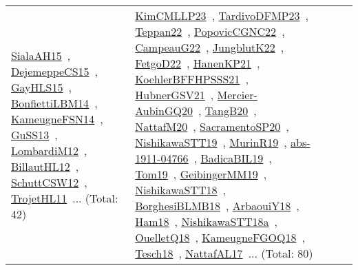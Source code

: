{\begin{longtable}{lp{3cm}>{\raggedright\arraybackslash}p{6cm}>{\raggedright\arraybackslash}p{6cm}>{\raggedright\arraybackslash}p{8cm}}
\href{works/SialaAH15.pdf}{SialaAH15}~\cite{SialaAH15}, \href{works/DejemeppeCS15.pdf}{DejemeppeCS15}~\cite{DejemeppeCS15}, \href{works/GayHLS15.pdf}{GayHLS15}~\cite{GayHLS15}, \href{works/BonfiettiLBM14.pdf}{BonfiettiLBM14}~\cite{BonfiettiLBM14}, \href{works/KameugneFSN14.pdf}{KameugneFSN14}~\cite{KameugneFSN14}, \href{works/GuSS13.pdf}{GuSS13}~\cite{GuSS13}, \href{works/LombardiM12.pdf}{LombardiM12}~\cite{LombardiM12}, \href{works/BillautHL12.pdf}{BillautHL12}~\cite{BillautHL12}, \href{works/SchuttCSW12.pdf}{SchuttCSW12}~\cite{SchuttCSW12}, \href{works/TrojetHL11.pdf}{TrojetHL11}~\cite{TrojetHL11}... (Total: 42) & \href{works/KimCMLLP23.pdf}{KimCMLLP23}~\cite{KimCMLLP23}, \href{works/TardivoDFMP23.pdf}{TardivoDFMP23}~\cite{TardivoDFMP23}, \href{works/Teppan22.pdf}{Teppan22}~\cite{Teppan22}, \href{works/PopovicCGNC22.pdf}{PopovicCGNC22}~\cite{PopovicCGNC22}, \href{works/CampeauG22.pdf}{CampeauG22}~\cite{CampeauG22}, \href{works/JungblutK22.pdf}{JungblutK22}~\cite{JungblutK22}, \href{works/FetgoD22.pdf}{FetgoD22}~\cite{FetgoD22}, \href{works/HanenKP21.pdf}{HanenKP21}~\cite{HanenKP21}, \href{works/KoehlerBFFHPSSS21.pdf}{KoehlerBFFHPSSS21}~\cite{KoehlerBFFHPSSS21}, \href{works/HubnerGSV21.pdf}{HubnerGSV21}~\cite{HubnerGSV21}, \href{works/Mercier-AubinGQ20.pdf}{Mercier-AubinGQ20}~\cite{Mercier-AubinGQ20}, \href{works/TangB20.pdf}{TangB20}~\cite{TangB20}, \href{works/NattafM20.pdf}{NattafM20}~\cite{NattafM20}, \href{works/SacramentoSP20.pdf}{SacramentoSP20}~\cite{SacramentoSP20}, \href{works/NishikawaSTT19.pdf}{NishikawaSTT19}~\cite{NishikawaSTT19}, \href{works/MurinR19.pdf}{MurinR19}~\cite{MurinR19}, \href{works/abs-1911-04766.pdf}{abs-1911-04766}~\cite{abs-1911-04766}, \href{works/BadicaBIL19.pdf}{BadicaBIL19}~\cite{BadicaBIL19}, \href{works/Tom19.pdf}{Tom19}~\cite{Tom19}, \href{works/GeibingerMM19.pdf}{GeibingerMM19}~\cite{GeibingerMM19}, \href{works/NishikawaSTT18.pdf}{NishikawaSTT18}~\cite{NishikawaSTT18}, \href{works/BorghesiBLMB18.pdf}{BorghesiBLMB18}~\cite{BorghesiBLMB18}, \href{works/ArbaouiY18.pdf}{ArbaouiY18}~\cite{ArbaouiY18}, \href{works/Ham18.pdf}{Ham18}~\cite{Ham18}, \href{works/NishikawaSTT18a.pdf}{NishikawaSTT18a}~\cite{NishikawaSTT18a}, \href{works/OuelletQ18.pdf}{OuelletQ18}~\cite{OuelletQ18}, \href{works/KameugneFGOQ18.pdf}{KameugneFGOQ18}~\cite{KameugneFGOQ18}, \href{works/Tesch18.pdf}{Tesch18}~\cite{Tesch18}, \href{works/NattafAL17.pdf}{NattafAL17}~\cite{NattafAL17}... (Total: 80)\\

\end{longtable}}
